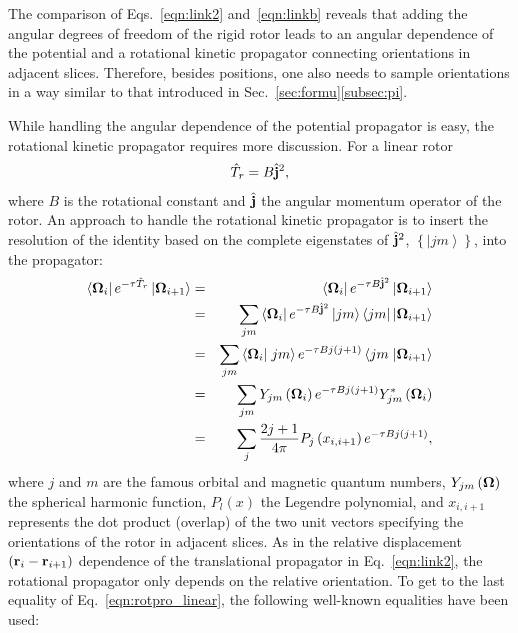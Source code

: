 \documentclass[12pt]{iopart}
\begin{document}
The comparison of Eqs.~\ref{eqn:link2} and~\ref{eqn:linkb} reveals that adding the angular degrees of freedom of the rigid rotor leads to an angular dependence of the potential and a rotational kinetic propagator connecting orientations in adjacent slices. Therefore, besides positions, one also needs to sample orientations in a way similar to that introduced in Sec.~\ref{sec:formu}\ref{subsec:pi}.

While handling the angular dependence of the potential propagator is easy, the rotational kinetic propagator requires more discussion. For a linear rotor
\begin{eqnarray}
\hat{T}_r=B\hat{{\bf j}}^2,
\end{eqnarray}
where $B$ is the rotational constant and ${\hat{\bf j}}$ the angular momentum operator of the rotor. 
An approach to handle the rotational kinetic propagator is to insert the resolution of the identity based on the complete eigenstates of ${\hat{\bf j}}^2$, $\left\{ \left|jm\right> \right\}$, into the propagator:
\begin{eqnarray}
\left<{\bf \Omega}_i\right| e^{ -\tau\hat{T}_r }\left| {\bf \Omega}_{i+1} \right>&=&\left<{\bf \Omega}_i\right| e^{ -\tau B \hat{{\bf j}}^2 }\left| {\bf \Omega}_{i+1} \right>\nonumber\\
&=&\sum_{jm}\left<{\bf \Omega}_i\right| e^{ -\tau B \hat{{\bf j}}^2 }\left|jm \right>\left< jm \right|\left| {\bf \Omega}_{i+1} \right>\nonumber\\
&=&\sum_{jm}\left<{\bf \Omega}_i\right|\left.jm\right> e^{ -\tau B j\left( j+1\right) }\left< jm\right.\left| {\bf \Omega}_{i+1} \right>\nonumber\\
&=&\sum_{jm}Y_{jm}\left({\bf \Omega}_i\right)e^{-\tau B j\left( j+1\right)}Y_{jm}^*\left({\bf \Omega}_i\right)\nonumber\\
&=&\sum_{j}\frac{2j+1}{4\pi}P_j\left(x_{i,i+1}\right) e^{ -\tau B j\left( j+1\right) }, \label{eqn:rotpro_linear}
\end{eqnarray}
where $j$ and $m$ are the famous orbital and magnetic quantum numbers, $Y_{jm}\left({\bf \Omega} \right)$ the spherical harmonic function, $P_l\left( x\right)$ the Legendre polynomial, and $x_{i,i+1}$ represents the dot product (overlap) of the two unit vectors specifying the orientations of the rotor in adjacent slices. 
As in the relative displacement $\left({\bf r}_i - {\bf r}_{i+1}\right)$ dependence of the translational propagator in Eq.~\ref{eqn:link2}, the rotational propagator only depends on the relative orientation. To get to the last equality of Eq.~\ref{eqn:rotpro_linear}, the following well-known equalities have been used:
\end{document}
